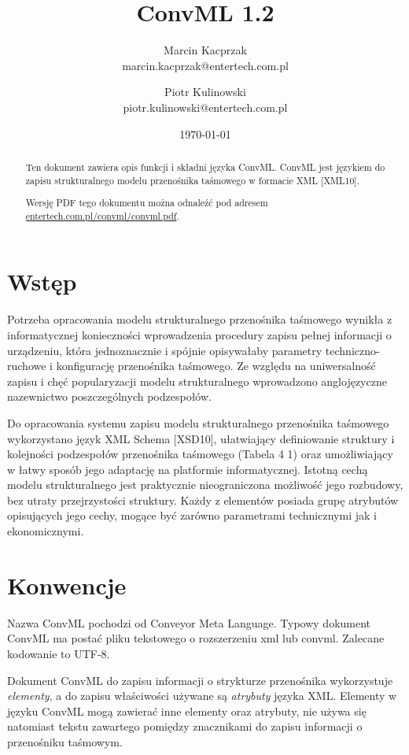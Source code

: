 \documentclass[12pt,a4paper]{article}
\title{ConvML 1.2}
\author{Marcin Kacprzak\\ marcin.kacprzak@entertech.com.pl\\
  \and Piotr Kulinowski\\ piotr.kulinowski@entertech.com.pl}
\date{\today}
\begin{document}
\maketitle

\begin{abstract}
  Ten dokument zawiera opis funkcji i składni języka ConvML.  ConvML jest językiem
  do zapisu strukturalnego modelu przenośnika taśmowego w formacie XML [XML10].

  Wersję PDF tego dokumentu można odnaleźć pod adresem
  \href{http://www.entertech.com.pl/convml/convml.pdf}{entertech.com.pl/convml/convml.pdf}.
\end{abstract}

\tableofcontents


\section{Wstęp}
Potrzeba opracowania modelu strukturalnego przenośnika taśmowego wynikła z
informatycznej konieczności wprowadzenia procedury zapisu pełnej informacji o
urządzeniu, która jednoznacznie i spójnie opisywałaby parametry
techniczno-ruchowe i konfigurację przenośnika taśmowego.  Ze względu na
uniwersalność zapisu i chęć popularyzacji modelu strukturalnego wprowadzono
anglojęzyczne nazewnictwo poszczególnych podzespołów.

Do opracowania systemu zapisu modelu strukturalnego przenośnika taśmowego
wykorzystano język XML Schema [XSD10], ułatwiający definiowanie struktury i
kolejności podzespołów przenośnika taśmowego (Tabela 4 1) oraz umożliwiający w
łatwy sposób jego adaptację na platformie informatycznej.  Istotną cechą modelu
strukturalnego jest praktycznie nieograniczona możliwość jego rozbudowy, bez
utraty przejrzystości struktury.  Każdy z elementów posiada grupę atrybutów
opisujących jego cechy, mogące być zarówno parametrami technicznymi jak i
ekonomicznymi.


\section{Konwencje}
Nazwa ConvML pochodzi od Conveyor Meta Language.  Typowy dokument ConvML ma
postać pliku tekstowego o rozszerzeniu xml lub convml.  Zalecane kodowanie to
UTF-8.

Dokument ConvML do zapisu informacji o strykturze przenośnika wykorzystuje
\emph{elementy}, a do zapisu właściwości używane są \emph{atrybuty} języka XML.
Elementy w języku ConvML mogą zawierać inne elementy oraz atrybuty, nie używa
się natomiast tekstu zawartego pomiędzy znacznikami do zapisu informacji o
przenośniku taśmowym.
\end{document}
